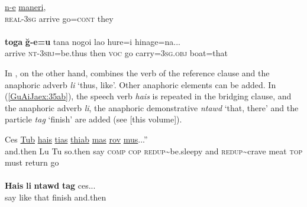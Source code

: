 \documentclass[output=paper]{LSP/langsci}
\begin{document}
\begin{exe}
\ex \label{GuAiex:34ab}
\begin{xlist}
\ex \label{GuAiex:34a}
\gll \underline{n-e}     \underline{}   \underline{}     \underline{maneri},\\
  \textsc{real-3sg} arrive   go=\textsc{cont} they \\
\glt {} \\
\ex \label{GuAiex:34b}
\gll  \textbf{toga}  \textbf{ğ-e=u}                tana   nogoi        lao   hure=i           hinage=na...\\
arrive            \textsc{nt-3sbj}=be.thus   then   \textsc{voc} go   carry=\textsc{3sg.obj}   boat=that\\
\glt {}
\end{xlist}
\end{exe}


In , on the other hand,  combines the verb of the reference clause and the anaphoric adverb \textit{li} `thus, like'. Other anaphoric elements can be added. In (\ref{GuAiJaex:35ab}), the speech verb \textit{hais} is repeated in the bridging clause, and the anaphoric adverb \textit{li}, the anaphoric demonstrative \textit{ntawd} `that, there' and the particle \textit{tag} `finish' are added (see \citealt{chapters/05Jarkey} [this volume]).


\begin{exe}
\ex \label{GuAiJaex:35ab}
\begin{xlist}
\ex \label{GuAiJaex:35a}
\gll Ces \underline{} \underline{Tub} \underline{} \underline{hais} \underline{tias} \underline{}     \underline{} \underline{thiab} \underline{} \underline{} \underline{mas} \underline{} \underline{rov} \underline{mus}...'' \\
 and.then Lu Tu so.then say \textsc{comp} \textsc{cop} \textsc{redup}{\textasciitilde}be.sleepy and \textsc{redup}{\textasciitilde}crave  meat \textsc{top} must return go\\
\glt {}\\
\ex \label{GuAiJaex:35b}
\gll \textbf{Hais} \textbf{li}  \textbf{ntawd} \textbf{tag} ces... \\     	      
     say like that  finish  and.then\\
\glt {} 
\end{xlist}
\end{exe}
\end{document}
